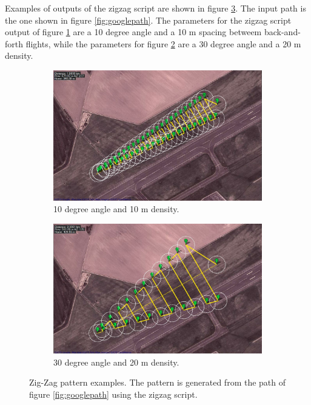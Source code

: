 Examples of outputs of the zigzag script are shown in figure \ref{fig:apmpath}. The input path is the one shown in figure \ref{fig:googlepath}.
The parameters for the zigzag script output of figure \ref{fig:apmpath1} are a 10 degree angle and a 10 m spacing betweem back-and-forth flights, while the parameters for figure \ref{fig:apmpath2} are a 30 degree angle and a 20 m density.
\begin{figure}[ht]
\centering
  \begin{subfigure}[t]{0.45\textwidth}
    \includegraphics[width = \textwidth]{Images/apmpath10}
    \caption{10 degree angle and 10 m density.}
    \label{fig:apmpath1}
  \end{subfigure}
  \begin{subfigure}[t]{0.45\textwidth}
    \includegraphics[width = \textwidth]{Images/apmpath30}
    \caption{30 degree angle and 20 m density.}
    \label{fig:apmpath2}
  \end{subfigure}  
\caption[Zig-Zag pattern examples.]
{Zig-Zag pattern examples. The pattern is generated from the path of figure \ref{fig:googlepath} using the zigzag script.}
\label{fig:apmpath}
\end{figure}


\newpage